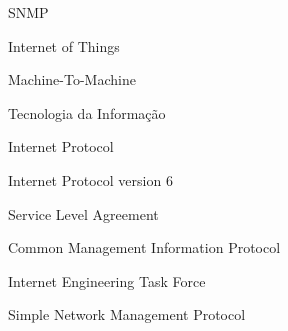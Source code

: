 \documentclass[twoside,english,brazilian]{UNISINOSmonografia}
\begin{document}
%






%


%
\begin{listadesiglas}{SNMP}
\item[IoT] Internet of Things
\item[M2M] Machine-To-Machine
\item[TI] Tecnologia da Informação
\item[IP] Internet Protocol
\item[IPv6] Internet Protocol version 6
\item[SLA] Service Level Agreement
\item[CMIP] Common Management Information Protocol
\item[IETF] Internet Engineering Task Force
\item[SNMP] Simple Network Management Protocol
\end{listadesiglas}
\end{document}
